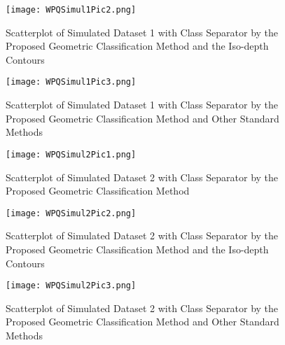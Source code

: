 \documentclass[twoside]{article}
\begin{document}
\begin{figure}[H]
\texttt{[image: WPQSimul1Pic2.png]}
\caption{Scatterplot of Simulated Dataset 1 with Class Separator by the Proposed Geometric Classification Method and the Iso-depth Contours}
\label{fig:SimulatedExample2}
\end{figure}

\begin{figure}[H]
\texttt{[image: WPQSimul1Pic3.png]}
\caption{Scatterplot of Simulated Dataset 1 with Class Separator by the Proposed Geometric Classification Method and Other Standard Methods}
\label{fig:SimulatedExample3}
\end{figure}

\begin{figure}[H]
\texttt{[image: WPQSimul2Pic1.png]}
\caption{Scatterplot of Simulated Dataset 2 with Class Separator by the Proposed Geometric Classification Method}
\label{fig:SimulatedExample4}
\end{figure}

\begin{figure}[H]
\texttt{[image: WPQSimul2Pic2.png]}
\caption{Scatterplot of Simulated Dataset 2 with Class Separator by the Proposed Geometric Classification Method and the Iso-depth Contours}
\label{fig:SimulatedExample5}
\end{figure}

\begin{figure}[H]
\texttt{[image: WPQSimul2Pic3.png]}
\caption{Scatterplot of Simulated Dataset 2 with Class Separator by the Proposed Geometric Classification Method and Other Standard Methods}
\label{fig:SimulatedExample6}
\end{figure}





\newpage


\end{document}
